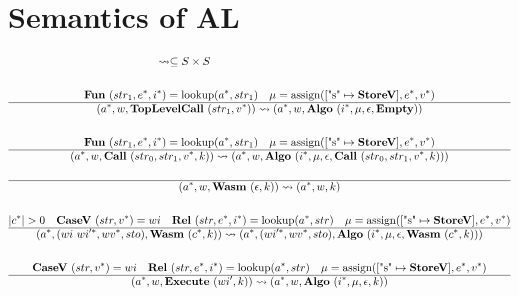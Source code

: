 \section{Semantics of AL}
\label{semantics}


\begin{gather*}
\leadsto \subseteq S \times S
\newline \\
%
\newline \\
  \fun ~ (str_1, \seq e, \seq i) = \lookup(\seq{a}, str_1) \quad \mu = \assign([\text{"s"} \mapsto \storev], \seq e, \seq v) \\
  \hline
  (\seq{a}, w, \toplevelcall ~ (str_1, \seq v)) \leadsto (\seq{a}, w, \algo ~ (\seq i, \mu, \epsilon, \mt)) \\
%
\newline \\
  \fun ~ (str_1, \seq e, \seq i) = \lookup(\seq{a}, str_1) \quad \mu = \assign([\text{"s"} \mapsto \storev], \seq e, \seq v) \\
  \hline
  (\seq{a}, w, \call ~ (str_0, str_1, \seq v, k)) \leadsto (\seq{a}, w, \algo ~ (\seq i, \mu, \epsilon, \call ~ (str_0, str_1, \seq v, k))) \\
%
\newline \\
  \hline
  (\seq{a}, w, \wasm ~ (\epsilon, k)) \leadsto (\seq{a}, w, k) \\
%
\newline \\
  |\seq c| > 0 \quad
  \casev ~ (str, \seq v) = wi \quad
  \rel ~ (str, \seq e, \seq i) = \lookup(\seq{a}, str) \quad
  \mu = \assign([\text{"s"} \mapsto \storev], \seq e, \seq v) \\
  \hline
  (\seq{a}, (wi ~ \seq{wi'}, \seq{wv}, sto), \wasm ~ (\seq c, k))
  \leadsto
  (\seq{a}, (\seq{wi'}, \seq{wv}, sto), \algo ~ (\seq i, \mu, \epsilon, \wasm ~ (\seq c, k))) \\
%
\newline \\
  \casev ~ (str, \seq v) = wi \quad
  \rel ~ (str, \seq e, \seq i) = \lookup(\seq{a}, str) \quad
  \mu = \assign([\text{"s"} \mapsto \storev], \seq e, \seq v) \\
  \hline
  (\seq{a}, w, \exe ~ (wi', k)) \leadsto (\seq{a}, w, \algo ~ (\seq i, \mu, \epsilon, k)) \\

\end{gather*}
